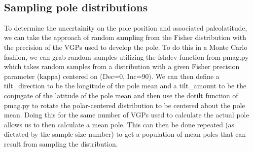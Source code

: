 \documentclass{article}
\begin{document}
    \begin{center}
    \end{center}
    { \hspace*{\fill} \\}
    

    \subsection{Sampling pole distributions}


    To determine the uncertainity on the pole position and associated
paleolatitude, we can take the approach of random sampling from the
Fisher distribution with the precision of the VGPs used to develop the
pole. To do this in a Monte Carlo fashion, we can grab random samples
utilizing the fshdev function from pmag.py which takes random samples
from a distribution with a given Fisher precision parameter (kappa)
centered on (Dec=0, Inc=90). We can then define a tilt\_direction to be
the longitude of the pole mean and a tilt\_amount to be the conjugate of
the latitude of the pole mean and then use the dotilt function of
pmag.py to rotate the polar-centered distribution to be centered about
the pole mean. Doing this for the same number of VGPs used to calculate
the actual pole allows us to then calculate a mean pole. This can then
be done repeated (as dictated by the sample size number) to get a
population of mean poles that can result from sampling the distribution.
\end{document}
